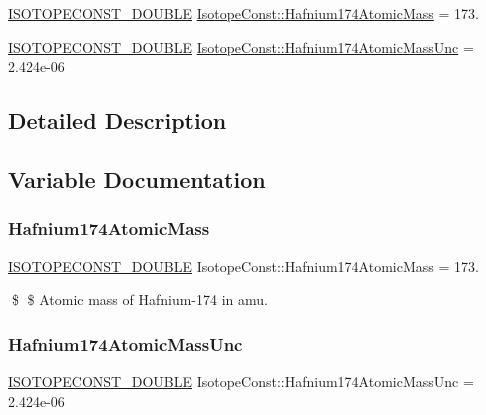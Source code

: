 \begin{DoxyCompactItemize}
\item 
\mbox{\hyperlink{group___isotope_const-_macros_ga8f45a7272ce02c0b4c65c44636ed719a}{I\+S\+O\+T\+O\+P\+E\+C\+O\+N\+S\+T\+\_\+\+D\+O\+U\+B\+LE}} \mbox{\hyperlink{group___isotope_const-_hafnium-_hf174_ga8ecaaab65a9845427ce7a4d4b405bc5d}{Isotope\+Const\+::\+Hafnium174\+Atomic\+Mass}} = 173.
\item 
\mbox{\hyperlink{group___isotope_const-_macros_ga8f45a7272ce02c0b4c65c44636ed719a}{I\+S\+O\+T\+O\+P\+E\+C\+O\+N\+S\+T\+\_\+\+D\+O\+U\+B\+LE}} \mbox{\hyperlink{group___isotope_const-_hafnium-_hf174_ga9e7f0d452a9690551a5c004603270cea}{Isotope\+Const\+::\+Hafnium174\+Atomic\+Mass\+Unc}} = 2.\+424e-\/06
\end{DoxyCompactItemize}


\subsection{Detailed Description}


\subsection{Variable Documentation}
\mbox{\label{group___isotope_const-_hafnium-_hf174_ga8ecaaab65a9845427ce7a4d4b405bc5d}} 
\subsubsection{\texorpdfstring{Hafnium174\+Atomic\+Mass}{Hafnium174AtomicMass}}
{\footnotesize\ttfamily \mbox{\hyperlink{group___isotope_const-_macros_ga8f45a7272ce02c0b4c65c44636ed719a}{I\+S\+O\+T\+O\+P\+E\+C\+O\+N\+S\+T\+\_\+\+D\+O\+U\+B\+LE}} Isotope\+Const\+::\+Hafnium174\+Atomic\+Mass = 173.}

\$ \$ Atomic mass of Hafnium-\/174 in amu. \mbox{\label{group___isotope_const-_hafnium-_hf174_ga9e7f0d452a9690551a5c004603270cea}} 
\subsubsection{\texorpdfstring{Hafnium174\+Atomic\+Mass\+Unc}{Hafnium174AtomicMassUnc}}
{\footnotesize\ttfamily \mbox{\hyperlink{group___isotope_const-_macros_ga8f45a7272ce02c0b4c65c44636ed719a}{I\+S\+O\+T\+O\+P\+E\+C\+O\+N\+S\+T\+\_\+\+D\+O\+U\+B\+LE}} Isotope\+Const\+::\+Hafnium174\+Atomic\+Mass\+Unc = 2.\+424e-\/06}

